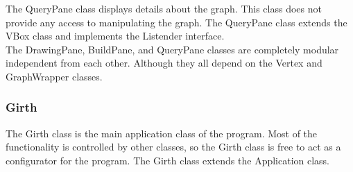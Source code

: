 \documentclass{article}
\begin{document}
The QueryPane class displays details about the graph. This class does not provide any access to manipulating the graph.
The QueryPane class extends the VBox class and implements the Listender interface.\\

The DrawingPane, BuildPane, and QueryPane classes are completely modular independent from each other.
Although they all depend on the Vertex and GraphWrapper classes.

\subsubsection{Girth}

The Girth class is the main application class of the program.
Most of the functionality is controlled by other classes,
so the Girth class is free to act as a configurator for the program.
The Girth class extends the Application class.
\end{document}
